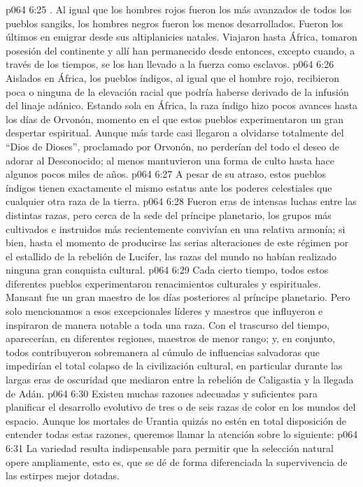 \vs p064 6:25 . Al igual que los hombres rojos fueron los más avanzados de todos los pueblos sangiks, los hombres negros fueron los menos desarrollados. Fueron los últimos en emigrar desde sus altiplanicies natales. Viajaron hasta África, tomaron posesión del continente y allí han permanecido desde entonces, excepto cuando, a través de los tiempos, se los han llevado a la fuerza como esclavos.
\vs p064 6:26 Aislados en África, los pueblos índigos, al igual que el hombre rojo, recibieron poca o ninguna de la elevación racial que podría haberse derivado de la infusión del linaje adánico. Estando sola en África, la raza índigo hizo pocos avances hasta los días de Orvonón, momento en el que estos pueblos experimentaron un gran despertar espiritual. Aunque más tarde casi llegaron a olvidarse totalmente del “Dios de Dioses”, proclamado por Orvonón, no perderían del todo el deseo de adorar al Desconocido; al menos mantuvieron una forma de culto hasta hace algunos pocos miles de años.
\vs p064 6:27 A pesar de su atraso, estos pueblos índigos tienen exactamente el mismo estatus ante los poderes celestiales que cualquier otra raza de la tierra.
\vs p064 6:28 \pc Fueron eras de intensas luchas entre las distintas razas, pero cerca de la sede del príncipe planetario, los grupos más cultivados e instruidos más recientemente convivían en una relativa armonía; si bien, hasta el momento de producirse las serias alteraciones de este régimen por el estallido de la rebelión de Lucifer, las razas del mundo no habían realizado ninguna gran conquista cultural.
\vs p064 6:29 \pc Cada cierto tiempo, todos estos diferentes pueblos experimentaron renacimientos culturales y espirituales. Mansant fue un gran maestro de los días posteriores al príncipe planetario. Pero solo mencionamos a esos excepcionales líderes y maestros que influyeron e inspiraron de manera notable a toda una raza. Con el trascurso del tiempo, aparecerían, en diferentes regiones, maestros de menor rango; y, en conjunto, todos contribuyeron sobremanera al cúmulo de influencias salvadoras que impedirían el total colapso de la civilización cultural, en particular durante las largas eras de oscuridad que mediaron entre la rebelión de Caligastia y la llegada de Adán.
\vs p064 6:30 \pc Existen muchas razones adecuadas y suficientes para planificar el desarrollo evolutivo de tres o de seis razas de color en los mundos del espacio. Aunque los mortales de Urantia quizás no estén en total disposición de entender todas estas razones, queremos llamar la atención sobre lo siguiente:
\vs p064 6:31 La variedad resulta indispensable para permitir que la selección natural opere ampliamente, esto es, que se dé de forma diferenciada la supervivencia de las estirpes mejor dotadas.
